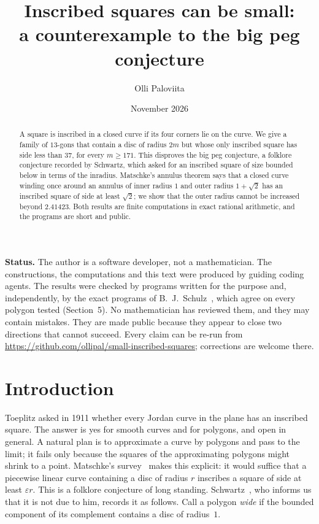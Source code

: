 \documentclass[11pt,a4paper]{article}
\title{Inscribed squares can be small:\\ a counterexample to the big peg conjecture}
\author{Olli Paloviita}
\date{November 2026}
\theoremstyle{remark}\newtheorem{remark}[theorem]{Remark}
\begin{document}
\maketitle

\begin{abstract}
A square is inscribed in a closed curve if its four corners lie on the curve.
We give a family of $13$-gons that contain a disc of radius $2m$ but whose only
inscribed square has side less than $37$, for every $m\ge171$. This disproves the big peg conjecture, a folklore conjecture recorded by
Schwartz, which asked for an inscribed square of size
bounded below in terms of the inradius. Matschke's annulus theorem says that a
closed curve winding once around an annulus of inner radius $1$ and outer radius
$1+\sqrt2$ has an inscribed square of side at least $\sqrt2$; we show that the
outer radius cannot be increased beyond $2.41423$.
Both results are finite computations in exact rational arithmetic, and the
programs are short and public.
\end{abstract}

\noindent\textbf{Status.} The author is a software developer, not a mathematician.
The constructions, the computations and this text were produced by guiding coding
agents. The results were checked by programs written for the purpose and,
independently, by the exact programs of B.~J.~Schulz~\cite{schulz}, which agree
on every polygon tested (Section~5). No mathematician has reviewed them, and they
may contain mistakes. They are made public because they appear to close two
directions that cannot succeed. Every claim can be re-run from
\url{https://github.com/ollipal/small-inscribed-squares}; corrections are welcome there.

\section{Introduction}

Toeplitz asked in 1911 whether every Jordan curve in the plane has an inscribed
square. The answer is yes for smooth curves and for polygons, and open in
general. A natural plan is to approximate a curve by polygons and pass to the
limit; it fails only because the squares of the approximating polygons might
shrink to a point. Matschke's survey~\cite{matschke-survey} makes this explicit:
it would suffice that a piecewise linear curve containing a disc of radius $r$
inscribes a square of side at least $\varepsilon r$. This is a folklore conjecture of long standing. Schwartz~\cite{schwartz}, who
informs us that it is not due to him, records it as follows. Call a polygon \emph{wide} if the bounded component
of its complement contains a disc of radius~$1$.
\end{document}
